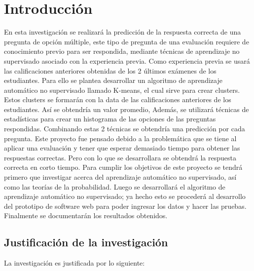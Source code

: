 \chapter{Introducción}
\setcounter{page}{1}
 
En esta investigación se realizará la predicción de la respuesta correcta de una pregunta de opción múltiple, este tipo de pregunta de una evaluación requiere de conocimiento previo para ser respondida, mediante técnicas de aprendizaje no supervisado asociado con la experiencia previa. Como experiencia previa se usará las calificaciones anteriores obtenidas de los 2 últimos exámenes de los estudiantes.
\vskip 0.3cm
Para ello se plantea desarrollar un algoritmo de aprendizaje automático no supervisado llamado K-means, el cual sirve para crear clusters. Estos clusters se formarán con la data de las calificaciones  anteriores  de  los  estudiantes. Así  se  obtendría  un  valor  promedio,  Además,  se utilizará técnicas de estadísticas para crear un histograma de las opciones de las preguntas respondidas. Combinando estas 2 técnicas se obtendría una predicción por cada pregunta.
\vskip 0.3cm  
Este proyecto fue pensado debido a la problemática que se tiene al aplicar una evaluación y tener que esperar demasiado tiempo para obtener las respuestas correctas. Pero con lo que se desarrollara se obtendrá la respuesta correcta en corto tiempo.
\vskip 0.3cm 
Para cumplir los objetivos de este proyecto se tendrá primero que investigar acerca del aprendizaje automático no supervisado, así como las teorías de la probabilidad. Luego se desarrollará el algoritmo de aprendizaje automático no supervisado; ya hecho esto se procederá al desarrollo del prototipo de software web para poder ingresar los datos y hacer las pruebas. Finalmente se documentarán los resultados obtenidos.

\section{Justificación de la investigación}
La investigación es justificada por lo siguiente:   

